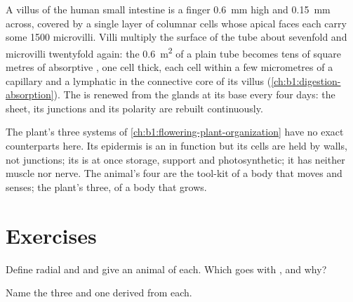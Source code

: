 \begin{example}\label{ex:b1:body-plans-tissues:villus}
A villus of the human small intestine is a finger \qty{0.6}{mm} high and
\qty{0.15}{mm} across, covered by a single layer of columnar cells whose
apical faces each carry some \qty{1500}{} microvilli. Villi multiply the
surface of the tube about sevenfold and microvilli twentyfold again:
the \qty{0.6}{m^2} of a plain tube becomes tens of square metres of
absorptive , one cell thick, each cell within a few
micrometres of a capillary and a lymphatic in the connective core of
its villus (\cref{ch:b1:digestion-absorption}). The  is
renewed from the glands at its base every four days: the sheet, its
junctions and its polarity are rebuilt continuously.
\end{example}

\begin{remark}\label{rem:b1:body-plans-tissues:plants}
The plant's three  systems of \cref{ch:b1:flowering-plant-organization}
have no exact counterparts here. Its epidermis is an  in
function but its cells are held by walls, not junctions; its  is at once storage, support and photosynthetic; it has neither
muscle nor nerve. The animal's four  are the tool-kit of a body
that moves and senses; the plant's three, of a body that grows.
\end{remark}

\section{Exercises}

\begin{exercise}[$\star$]\label{exo:b1:body-plans-tissues:1}
Define radial and  and give an animal of each.
Which goes with , and why?
\end{exercise}

\begin{exercise}[$\star$]\label{exo:b1:body-plans-tissues:2}
Name the three  and one  derived from each.
\end{exercise}

